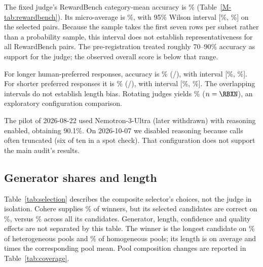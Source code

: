 The fixed judge's RewardBench category-mean accuracy is \RBOverallAcc\%
(Table~\ref{M-tab:rewardbench}).
Its micro-average is \RBMicroAcc\%, with 95\% Wilson interval
[\RBCILow\%, \RBCIHigh\%] on the selected \RBN{} pairs. Because the
sample takes the first seven rows per subset rather than a probability
sample, this interval does not establish representativeness for all
RewardBench pairs. The pre-registration treated roughly 70--90\% accuracy
as support for the judge; the observed overall score is below that range.

For longer human-preferred responses, accuracy is \RBChosenLongerAcc\%
(\RBChosenLongerK/\RBChosenLongerN{}), with interval
[\RBChosenLongerCILow\%, \RBChosenLongerCIHigh\%].
For shorter preferred responses it is \RBRejectedLongerAcc\%
(\RBRejectedLongerK/\RBRejectedLongerN{}), with interval
[\RBRejectedLongerCILow\%, \RBRejectedLongerCIHigh\%]. The overlapping
intervals do not establish length bias. Rotating judges yields
\RBXOverallAcc\% ($n=\RBXN$), an exploratory configuration comparison.

The pilot of 2026-08-22 used Nemotron-3-Ultra (later withdrawn) with
reasoning enabled, obtaining 90.1\%. On 2026-10-07 we disabled reasoning
because calls often truncated (six of ten in a spot check).
That configuration does not support the main audit's results.

\subsection{Generator shares and length}
\label{sec:generator-diagnostics}

Table~\ref{tab:selection} describes the composite selector's choices,
not the judge in isolation. Cohere supplies \PickShareCohere\% of winners,
but its selected candidates are correct on \PickAccCohere\%, versus
\CandAccCohere\% across all its candidates. Generator, length, confidence
and quality effects are not separated by this table. The winner is the
longest candidate on \LongestPickHetPct\% of heterogeneous pools and
\LongestPickHomPct\% of homogeneous pools; its length is on average
\WinnerLenRatioHet{} and \WinnerLenRatioHom{} times the corresponding
pool mean. Pool composition changes are reported in Table~\ref{tab:coverage}.

\begin{table}[htbp]
\centering
\caption{Generator composition and OR-Select picks over \SelectionRows{}
heterogeneous problems. Accuracy and pick share are percentages.}
\label{tab:selection}
\small
{}
\end{table}

